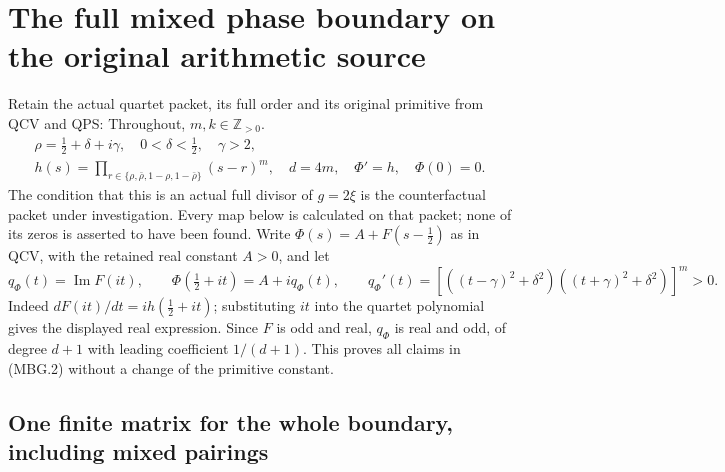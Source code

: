 \section{The full mixed phase boundary on the original arithmetic source}
\label{sec:mbg-source}

Retain the actual quartet packet, its full order and its original primitive
from QCV and QPS:
Throughout, \(m,k\in\mathbb Z_{>0}\).
\[
 \begin{gathered}
 \rho=\tfrac12+\delta+i\gamma,\quad
 0<\delta<\tfrac12,\quad\gamma>2,\\
 h(s)=\prod_{r\in\{\rho,\bar\rho,1-\rho,1-\bar\rho\}}(s-r)^m,
 \quad d=4m,\quad \Phi'=h,\quad\Phi(0)=0.
 \end{gathered}
 \tag{MBG.1}\label{eq:mbg-packet}
\]
The condition that this is an actual full divisor of \(g=2\xi\) is the
counterfactual packet under investigation. Every map below is calculated
on that packet; none of its zeros is asserted to have been found.
Write \(\Phi(s)=A+F(s-\tfrac12)\) as in QCV, with the retained real
constant \(A>0\), and let
\[
 q_\Phi(t)=\operatorname{Im}F(it),\qquad
 \Phi(\tfrac12+it)=A+iq_\Phi(t),\qquad
 q_\Phi'(t)=
 \left[((t-\gamma)^2+\delta^2)((t+\gamma)^2+\delta^2)\right]^m>0.
 \tag{MBG.2}\label{eq:mbg-line}
\]
Indeed \(dF(it)/dt=i h(\tfrac12+it)\); substituting \(it\) into the
quartet polynomial gives the displayed real expression. Since \(F\) is
odd and real, \(q_\Phi\) is real and odd, of degree \(d+1\) with leading
coefficient \(1/(d+1)\). This proves all claims in (MBG.2) without a
change of the primitive constant.

\subsection{One finite matrix for the whole boundary, including mixed pairings}

